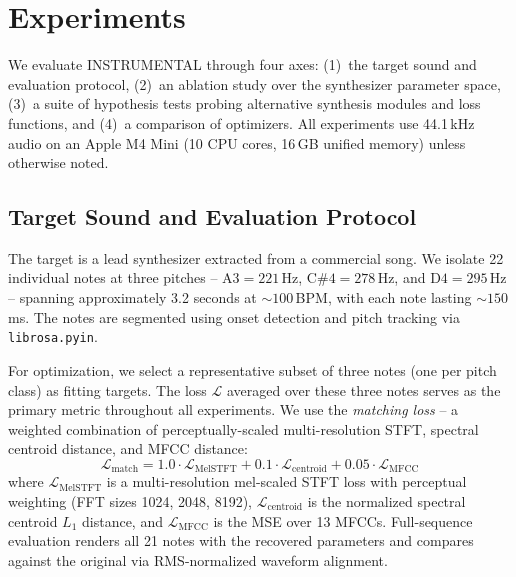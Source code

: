 \section{Experiments}
\label{sec:experiments}

We evaluate INSTRUMENTAL through four axes: (1)~the target sound and evaluation protocol, (2)~an ablation study over the synthesizer parameter space, (3)~a suite of hypothesis tests probing alternative synthesis modules and loss functions, and (4)~a comparison of optimizers.
All experiments use 44.1\,kHz audio on an Apple M4 Mini (10 CPU cores, 16\,GB unified memory) unless otherwise noted.

\subsection{Target Sound and Evaluation Protocol}
\label{sec:target-sound}

The target is a lead synthesizer extracted from a commercial song.
We isolate 22 individual notes at three pitches -- $\text{A3}=221$\,Hz, $\text{C\#4}=278$\,Hz, and $\text{D4}=295$\,Hz -- spanning approximately 3.2 seconds at ${\sim}100$\,BPM, with each note lasting ${\sim}150$\,ms.
The notes are segmented using onset detection and pitch tracking via \texttt{librosa.pyin}.

For optimization, we select a representative subset of three notes (one per pitch class) as fitting targets.
The loss $\mathcal{L}$ averaged over these three notes serves as the primary metric throughout all experiments.
We use the \emph{matching loss} -- a weighted combination of perceptually-scaled multi-resolution STFT, spectral centroid distance, and MFCC distance:
\begin{equation}
  \mathcal{L}_{\text{match}} = 1.0 \cdot \mathcal{L}_{\text{MelSTFT}} + 0.1 \cdot \mathcal{L}_{\text{centroid}} + 0.05 \cdot \mathcal{L}_{\text{MFCC}}
  \label{eq:matching-loss}
\end{equation}
where $\mathcal{L}_{\text{MelSTFT}}$ is a multi-resolution mel-scaled STFT loss with perceptual weighting (FFT sizes 1024, 2048, 8192), $\mathcal{L}_{\text{centroid}}$ is the normalized spectral centroid $L_1$ distance, and $\mathcal{L}_{\text{MFCC}}$ is the MSE over 13 MFCCs.
Full-sequence evaluation renders all 21 notes with the recovered parameters and compares against the original via RMS-normalized waveform alignment.

